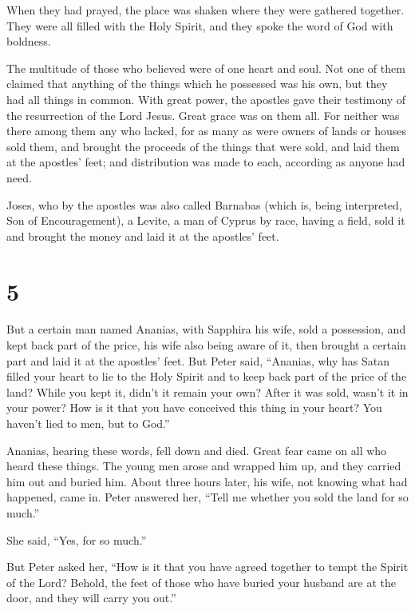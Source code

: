  When they had prayed, the place was shaken where they were
gathered together. They were all filled with the Holy Spirit, and they
spoke the word of God with boldness.

 The multitude of those who believed were of one heart and
soul. Not one of them claimed that anything of the things which he
possessed was his own, but they had all things in common. 
With great power, the apostles gave their testimony of the resurrection
of the Lord Jesus. Great grace was on them all.  For
neither was there among them any who lacked, for as many as were owners
of lands or houses sold them, and brought the proceeds of the things
that were sold,  and laid them at the apostles' feet; and
distribution was made to each, according as anyone had need.

 Joses, who by the apostles was also called Barnabas (which
is, being interpreted, Son of Encouragement), a Levite, a man of Cyprus
by race,  having a field, sold it and brought the money and
laid it at the apostles' feet.

\hypertarget{section-4}{%
\section{5}\label{section-4}}

 But a certain man named Ananias, with Sapphira his wife,
sold a possession,  and kept back part of the price, his
wife also being aware of it, then brought a certain part and laid it at
the apostles' feet.  But Peter said, ``Ananias, why has
Satan filled your heart to lie to the Holy Spirit and to keep back part
of the price of the land?  While you kept it, didn't it
remain your own? After it was sold, wasn't it in your power? How is it
that you have conceived this thing in your heart? You haven't lied to
men, but to God.''

 Ananias, hearing these words, fell down and died. Great
fear came on all who heard these things.  The young men
arose and wrapped him up, and they carried him out and buried him.
 About three hours later, his wife, not knowing what had
happened, came in.  Peter answered her, ``Tell me whether
you sold the land for so much.''

She said, ``Yes, for so much.''

 But Peter asked her, ``How is it that you have agreed
together to tempt the Spirit of the Lord? Behold, the feet of those who
have buried your husband are at the door, and they will carry you out.''

